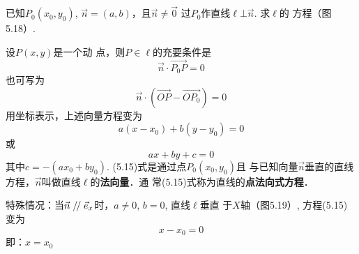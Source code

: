 已知$P_0(x_0,y_0)$, $\vec{n}=(a,b)$，且$\vec{n}\ne \vec{0}$
过$P_0$作直线$\ell\bot \vec{n}$. 求$\ell$的
方程（图5.18）.
\begin{figure}[htp]
    \centering
{}
    \caption{}
\end{figure}

设$P(x,y)$是一个动
点，则$P\in\ell$的充要条件是
\[\vec{n}\cdot \Vec{P_0P}=0\]
也可写为
\[\vec{n}\cdot (\Vec{OP}-\Vec{OP_0})=0\]
用坐标表示，上述向量方程变为
\begin{equation}
   a(x-x_0)+b(y-y_0)=0 
\end{equation}
或
\[ax+by+c=0\]
其中$c=-(ax_0+by_0)$. (5.15)式是通过点$P_0(x_0,y_0)$且
与已知向量$\vec{n}$垂直的直线方程，$\vec{n}$叫做直线$\ell$的\textbf{法向量}．通
常(5.15)式称为直线的\textbf{点法向式方程}．

特殊情况：当$\vec{n}\mathrel{/\mskip-2.5mu/} \vec{e}_x$时，$a\ne 0$, $b=0$, 直线$\ell$垂直
于$X$轴（图5.19）, 方程(5.15)变为
\[x-x_0=0\]
即：$x=x_0$


